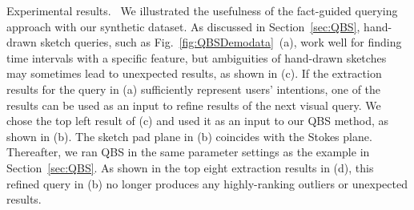 \textsf{Experimental results.\ } We illustrated the usefulness of the fact-guided querying approach with our synthetic dataset.
As discussed in Section~\ref{sec:QBS}, 
hand-drawn sketch queries, such as Fig.~\ref{fig:QBSDemodata}~(a), work well for finding time intervals with a specific feature,
but ambiguities of hand-drawn sketches may sometimes lead to unexpected results, as shown in (c).
%
If the extraction results for the query in (a) sufficiently represent users' intentions, one of the results can be used as an input to refine results of the next visual query.
We chose the top left result of (c) and used it as an input to our QBS method, as shown in (b). 
The sketch pad plane in (b) coincides with the Stokes plane.
Thereafter, we ran QBS in the same parameter settings as the example in Section~\ref{sec:QBS}.
As shown in the top eight extraction results in (d),  %
this refined query in (b) no longer produces any highly-ranking outliers or unexpected results.



